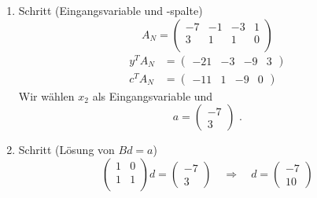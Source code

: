 \documentclass[a4paper]{scrartcl}
\begin{document}
\begin{enumerate}[label=\bfseries\arabic*.]
\begin{enumerate}[1.]
\begin{enumerate}[1.]
                    \item Schritt (Eingangsvariable und -spalte)
                        \begin{equation}
                            A_N =
                            \begin{pmatrix}
                                -7 & -1 & -3 & 1 \\
                                 3 &  1 &  1 & 0 \\
                            \end{pmatrix}
                        \end{equation}
                        \begin{align}
                            y^TA_N &=
                            \begin{pmatrix}
                                -21 & -3 & -9 & 3
                            \end{pmatrix} \\
                            c^TA_N &=
                            \begin{pmatrix}
                                -11 & 1 & -9 & 0
                            \end{pmatrix}
                        \end{align}
                        Wir wählen $x_2$ als Eingangsvariable und
                        \begin{equation}
                            a =
                            \begin{pmatrix}
                                -7 \\ 3
                            \end{pmatrix}
                            \text{ .}   
                        \end{equation}

                    \item Schritt (Lösung von $Bd = a$)
                        \begin{equation}
                            \begin{pmatrix}
                                1 & 0 \\
                                1 & 1 \\
                            \end{pmatrix}
                            d
                            =
                            \begin{pmatrix}
                                -7 \\ 3
                            \end{pmatrix}
                            \quad\Rightarrow\quad
                            d =
                            \begin{pmatrix}
                                -7 \\ 10
                            \end{pmatrix}
                        \end{equation}


\end{enumerate}
\end{enumerate}
\end{enumerate}
\end{document}
